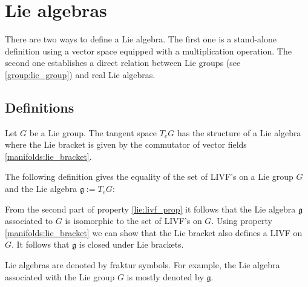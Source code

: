 \section{Lie algebras}
    	There are two ways to define a Lie algebra. The first one is a stand-alone definition using a vector space equipped with a multiplication operation. The second one establishes a direct relation between Lie groups (see \ref{group:lie_group}) and real Lie algebras.
        
\subsection{Definitions}

        
	\begin{property}
		Let $G$ be a Lie group. The tangent space $T_eG$ has the structure of a Lie algebra where the Lie bracket is given by the commutator of vector fields \ref{manifolds:lie_bracket}.
	\end{property}
        
        The following definition gives the equality of the set of LIVF's on a Lie group $G$ and the Lie algebra $\mathfrak{g} := T_eG$:
        \begin{adefinition}
        	From the second part of property \ref{lie:livf_prop} it follows that the Lie algebra $\mathfrak{g}$ associated to $G$ is isomorphic to the set of LIVF's on $G$. Using property \ref{manifolds:lie_bracket} we can show that the Lie bracket also defines a LIVF on $G$. It follows that $\mathfrak{g}$ is closed under Lie brackets.
        \end{adefinition}
        
        \begin{notation}
        	Lie algebras are denoted by fraktur symbols. For example, the Lie algebra associated with the Lie group $G$ is mostly denoted by $\mathfrak{g}$.
        \end{notation}
        
